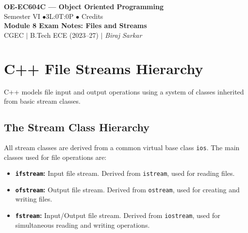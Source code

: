 \documentclass[12pt,a4paper]{article}
\begin{document}

\begin{center}
  {\LARGE\bfseries\color{myred} OE-EC604C --- Object Oriented Programming}\\[5pt]
  {\normalsize\color{mydark} Semester VI \quad$\bullet$\quad 3L:0T:0P \quad$\bullet$ Credits}\\[3pt]
  {\normalsize\color{myteal}\textbf{Module 8 Exam Notes: Files and Streams}}\\[3pt]
  {\small\color{mydark} CGEC \;$|$\; B.Tech ECE (2023--27) \;$|$\; \textit{Biraj Sarkar}}
\end{center}
\vspace{2pt}
\noindent{\color{myred}\rule{\linewidth}{1.5pt}}
\vspace{2pt}

\hypersetup{linkcolor=mydark}
\tableofcontents
\hypersetup{linkcolor=myteal}
\newpage

\section{C++ File Streams Hierarchy}

C++ models file input and output operations using a system of classes inherited from basic stream classes.

\subsection{The Stream Class Hierarchy}
All stream classes are derived from a common virtual base class \texttt{ios}. The main classes used for file operations are:
\begin{itemize}[leftmargin=*, itemsep=3.5pt]
  \item \textbf{\texttt{ifstream}:} Input file stream. Derived from \texttt{istream}, used for reading files.
  \item \textbf{\texttt{ofstream}:} Output file stream. Derived from \texttt{ostream}, used for creating and writing files.
  \item \textbf{\texttt{fstream}:} Input/Output file stream. Derived from \texttt{iostream}, used for simultaneous reading and writing operations.
\end{itemize}
\end{document}
